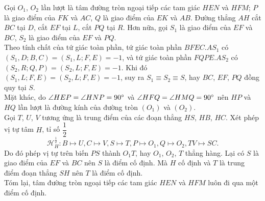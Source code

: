 \begin{center}
    \end{center}

    \begin{solution}
        Gọi \(O_1\), \(O_2\) lần lượt là tâm đường tròn ngoại tiếp các tam giác \(HEN\) và \(HFM\); \(P\) là giao điểm của \(FK\) và \(AC\), \(Q\) là giao điểm của \(EK\) và \(AB\). Đường thẳng \(AH\) cắt \(BC\) tại \(D\), cắt \(EF\) tại \(L\), cắt \(PQ\) tại \(R\). Hơn nữa, gọi \(S_1\) là giao điểm của \(EF\) và \(BC\), \(S_2\) là giao điểm của \(EF\) và \(PQ\).\\
        Theo tính chất của tứ giác toàn phần, tứ giác toàn phần \(BFEC.AS_1\) có \((S_1,D;B,C) = (S_1,L;F,E) = -1\), và tứ giác toàn phần \(FQPE.AS_2\) có \((S_2,R;Q,P) = (S_2,L;F,E) = -1\). Khi đó \((S_1,L;F,E) = (S_2,L;F,E) = -1\), suy ra \(S_1 \equiv S_2 \equiv S\), hay \(BC\), \(EF\), \(PQ\) đồng quy tại \(S\).\\
        Mặt khác, do \(\angle HEP = \angle HNP = 90 \degree\) và \(\angle HFQ = \angle HMQ = 90 \degree\) nên \(HP\) và \(HQ\) lần lượt là đường kính của đường tròn \((O_1)\) và \((O_2)\).\\
        Gọi \(T\), \(U\), \(V\) tương ứng là trung điểm của các đoạn thẳng \(HS\), \(HB\), \(HC\). Xét phép vị tự tâm \(H\), tỉ số \(\dfrac{1}{2}\)
        \[\mathcal{H}_{H}^{\frac{1}{2}}: B \mapsto U, C \mapsto V, S \mapsto T, P \mapsto O_1, Q \mapsto O_2, TV \mapsto SC.\]
        Do đó phép vị tự trên biến \(PS\) thành \(O_1T\), hay \(O_1\), \(O_2\), \(T\) thẳng hàng. Lại có \(S\) là giao điểm của \(EF\) và \(BC\) nên \(S\) là điểm cố định. Mà \(H\) cố định và \(T\) là trung điểm đoạn thẳng \(SH\) nên \(T\) là điểm cố định.\\
        Tóm lại, tâm đường tròn ngoại tiếp các tam giác \(HEN\) và \(HFM\) luôn đi qua một điểm cố định.
    \end{solution}

